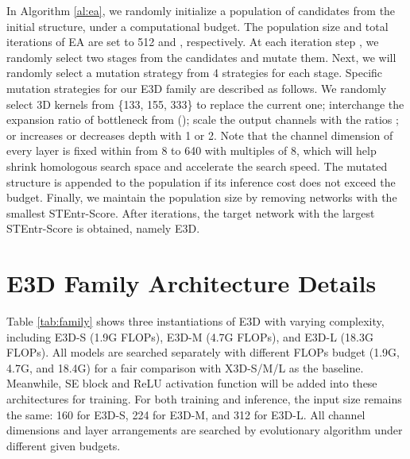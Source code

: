 \documentclass{article} \usepackage{iclr2023_conference,times}
\begin{document}
In Algorithm \ref{al:ea}, we randomly initialize a population of candidates from the initial structure, under a computational budget. The population size and total iterations of EA are set to 512 and , respectively.
At each iteration step , we randomly select two stages from the candidates and mutate them. Next, we will randomly select a mutation strategy from 4 strategies for each stage.
Specific mutation strategies for our E3D family are described as follows. We randomly select 3D kernels from \{133, 155, 333\} to replace the current one; interchange the expansion ratio of bottleneck from (); scale the output channels with the ratios ; or increases or decreases depth with 1 or 2. 
Note that the channel dimension of every layer is fixed within from 8 to 640 with multiples of 8, which will help shrink homologous search space and accelerate the search speed.
The mutated structure  is appended to the population if its inference cost does not exceed the budget.
Finally, we maintain the population size by removing networks with the smallest STEntr-Score.
After  iterations, the target network with the largest STEntr-Score is obtained, namely E3D.







\section{E3D Family Architecture Details}
\label{sec:architecture}

Table \ref{tab:family} shows three instantiations of E3D with varying complexity, including E3D-S (1.9G FLOPs), E3D-M (4.7G FLOPs), and E3D-L (18.3G FLOPs).
All models are searched separately with different FLOPs budget (1.9G, 4.7G, and 18.4G) for a fair comparison with X3D-S/M/L as the baseline.
Meanwhile, SE block and ReLU activation function will be added into these architectures for training.
For both training and inference, the input size remains the same: 160 for E3D-S, 224 for E3D-M, and 312 for E3D-L. 
All channel dimensions and layer arrangements are searched by evolutionary algorithm under different given budgets.
\end{document}
